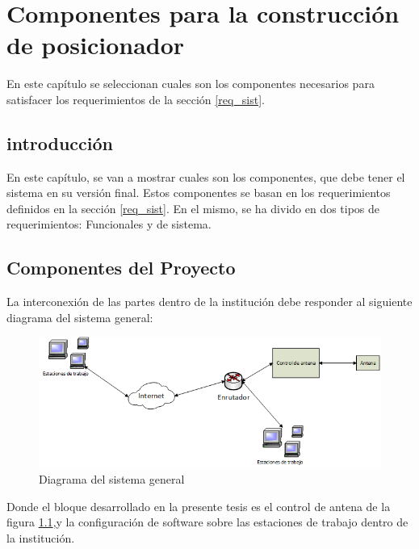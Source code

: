 \renewcommand{\chaptername}{Componentes para la construcción de posicionador}
\chapter{Componentes para la construcción de posicionador} 
\begin{center}
\begin{tcolorbox}[colback=gray!5!white, %
colframe=gray!75!black,
title= \center{\Large{resumen}} ]
En este capítulo se seleccionan cuales son los componentes necesarios para satisfacer los requerimientos de la sección \ref{req_sist}.   
\end{tcolorbox}
\end{center}    
\section{introducción}

En este capítulo, se van a mostrar cuales son los componentes, que debe tener el sistema en su versión final. Estos componentes se basan en los requerimientos definidos en la sección \ref{req_sist}. En el mismo, se ha divido en dos tipos de requerimientos: Funcionales y de sistema. 

\section{Componentes del Proyecto}

La interconexión de las partes dentro de la institución debe responder al siguiente diagrama del sistema general: 
\begin{figure}[ht]	
	\centering
	\includegraphics[scale=0.8]{parte_1/cap2/ssgen}
	\caption{Diagrama del sistema general}
	\label{fig:fig_ssgen}
\end{figure}


Donde el bloque desarrollado en la presente tesis es el control de antena de la figura \ref{fig:fig_ssgen},y la configuración de software sobre las estaciones de trabajo dentro de la institución. 

